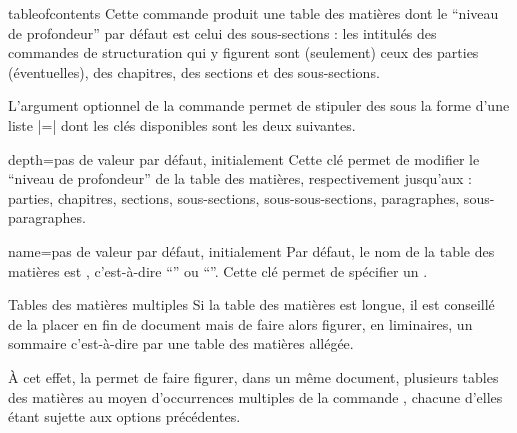 \begin{docCommand}[doc description=\mandatory]{tableofcontents}{}
  Cette commande produit une table des matières dont le \enquote{niveau de
    profondeur} par défaut est celui des sous-sections : les intitulés des
  commandes de structuration qui y figurent sont (seulement) ceux des parties
  (éventuelles), des chapitres, des sections et des sous-sections.
\end{docCommand}

L'argument optionnel de la commande  permet de stipuler
des  sous la forme d'une liste |=| dont
les clés disponibles sont les deux suivantes.
{%
  \begin{docKey}{depth}{=\textbar{}\textbar{}\textbar{}\textbar{}\textbar{}\textbar{}}{pas
      de valeur par défaut, initialement }
    Cette clé permet de modifier le \enquote{niveau de profondeur} de la table
    des matières, respectivement jusqu'aux : parties, chapitres, sections,
    sous-sections, sous-sous-sections, paragraphes, sous-paragraphes.
  \end{docKey}
}
%
\begin{docKey}{name}{=}{pas de valeur par défaut,
    initialement }
  Par défaut, le nom de la table des matières est ,
  c'est-à-dire \enquote{\contentsname} ou
  \enquote{\contentsname}\selonlangueshort{}. Cette clé
  permet de spécifier un \redefexprcle.
\end{docKey}

\begin{dbremark}{Tables des matières multiples}{}
  Si la table des matières est longue, il est conseillé de la placer en fin de
  document mais de faire alors figurer, en \glspl{liminaire}, un sommaire
  c'est-à-dire par une table des matières allégée.

  À cet effet, la \yatCl{} permet de faire figurer, dans un même document,
  plusieurs tables des matières au moyen d'occurrences multiples de la commande
  , chacune d'elles étant sujette aux options
  précédentes.
\end{dbremark}

